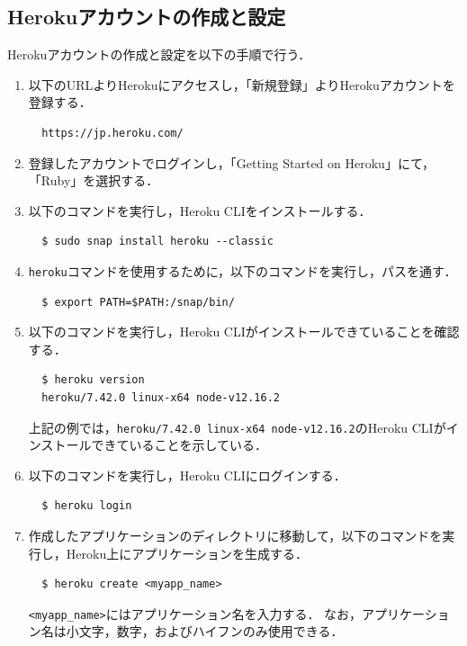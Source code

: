 \documentclass[12pt]{jsarticle}
\begin{document}
\subsection{Herokuアカウントの作成と設定}\label{sec:setup_Heroku}
Herokuアカウントの作成と設定を以下の手順で行う．
\begin{enumerate}
\item 以下のURLよりHerokuにアクセスし，「新規登録」よりHerokuアカウントを登録する．
\begin{verbatim}
  https://jp.heroku.com/
\end{verbatim}
\item 登録したアカウントでログインし，「Getting Started on Heroku」にて，「Ruby」を選択する．
\item 以下のコマンドを実行し，Heroku CLIをインストールする．
\begin{verbatim}
  $ sudo snap install heroku --classic
\end{verbatim}
\item \verb|heroku|コマンドを使用するために，以下のコマンドを実行し，パスを通す．
\begin{verbatim}
  $ export PATH=$PATH:/snap/bin/
\end{verbatim}
\item 以下のコマンドを実行し，Heroku CLIがインストールできていることを確認する．
\begin{verbatim}
  $ heroku version
  heroku/7.42.0 linux-x64 node-v12.16.2
\end{verbatim}
上記の例では，\verb|heroku/7.42.0 linux-x64 node-v12.16.2|のHeroku CLIがインストールできていることを示している．

\item 以下のコマンドを実行し，Heroku CLIにログインする．
\begin{verbatim}
  $ heroku login
\end{verbatim}

\item\label{enum:app} 作成したアプリケーションのディレクトリに移動して，以下のコマンドを実行し，Heroku上にアプリケーションを生成する．
\begin{verbatim}
  $ heroku create <myapp_name>
\end{verbatim}
\verb|<myapp_name>|にはアプリケーション名を入力する．
なお，アプリケーション名は小文字，数字，およびハイフンのみ使用できる．


\end{enumerate}
\end{document}

